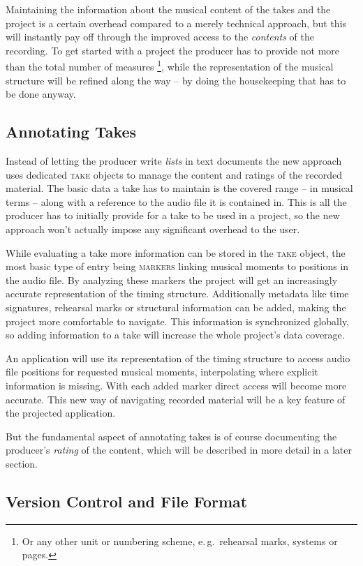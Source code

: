 \documentclass[11pt,a4paper]{article}
\newcommand*{\term}[1]{\textsc{#1}}
\begin{document}
Maintaining the information about the musical content of the takes and the project
is a certain overhead compared to a merely technical approach, but this will instantly
pay off through the improved access to the \emph{contents} of the recording.
To get started with a project the producer has to provide not more than
the total number of measures%
\footnote{Or any other unit or numbering scheme, e.\,g.\ rehearsal marks,
systems or pages.},
while the representation of the musical structure will be refined along the
way -- by doing the housekeeping that has to be done anyway.

\subsection{Annotating Takes}
Instead of letting the producer write \emph{lists} in text documents the new
approach uses dedicated \term{take} objects to manage the content and ratings
of the recorded material. The basic data a take has to maintain is the covered
range -- in musical terms -- along with a reference to the audio file it
is contained in. This is all the producer has to initially provide for a take
to be used in a project, so the new approach won't actually impose any
significant overhead to the user. 

While evaluating a take more information can be stored in the \term{take} object,
the most basic type of entry being \term{markers} linking musical moments to
positions in the audio file. By analyzing these markers the project will get
an increasingly accurate representation of the timing structure.
Additionally metadata like time signatures, rehearsal marks or
structural information can be added, making the project more comfortable to
navigate. This information is synchronized globally, so adding information to
a take will increase the whole project's data coverage.

An application will use its representation of the timing structure to access
audio file positions for requested musical moments, interpolating where
explicit information is missing. With each added marker direct access
will become more accurate. This new way of navigating recorded material will
be a key feature of the projected application.

But the fundamental aspect of annotating takes is of course documenting
the producer's \emph{rating} of the content, which will be described in
more detail in a later section.

\subsection{Version Control and File Format}
\end{document}
